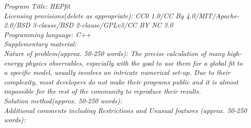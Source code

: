 \documentclass[preprint,3p,12pt]{elsarticle}
\begin{document}
\begin{small}
\noindent
{\em Program Title: HEPfit}                                          \\
{\em Licensing provisions(delete as appropriate): CC0 1.0/CC By 4.0/MIT/Apache-2.0/BSD 3-clause/BSD 2-clause/GPLv3/CC BY NC 3.0 }                                   \\
{\em Programming language: C++}                                   \\

{\em Supplementary material:}                                 \\

{\em Nature of problem(approx. 50-250 words): The precise calculation of many high-energy physics observables, especially with the goal to use them for a global fit to a specific model, usually involves an intricate numerical set-up. Due to their complexity, most developers do not make their programs public and it is almost impossible for the rest of the community to reproduce their results.}\\
{\em Solution method(approx. 50-250 words):}\\
{\em Additional comments including Restrictions and Unusual features (approx. 50-250 words):}\\
   \\

\end{small}






\tableofcontents
\end{document}
